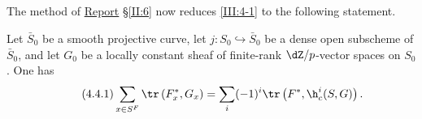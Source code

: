 \subsection{}\label{III:4-4}
The method of \hyperref[II]{Report} \S\ref{II:6} now reduces \ref{III:4-1} to the following statement.

\begingroup
\renewcommand*{\thesubsection}{4.1bis}
\begin{theorem_}\label{III:4-1bis}
Let $\bar S_0$ be a smooth projective curve, let
$j:S_0\hookrightarrow \bar S_0$ be a dense open subscheme of $\bar S_0$,
and let $G_0$ be a locally constant sheaf of finite-rank $\dZ/p$-vector
spaces on $S_0$. One has
\begin{equation*}\tag{4.4.1}\label{III:eq:4-4-1}
  \sum_{x\in S^F} \tr\left(F_x^*,G_x\right) = \sum_i (-1)^i \tr\left(F^*,\h_c^i(S,G)\right) \text{.}
\end{equation*}
\end{theorem_}
\endgroup
